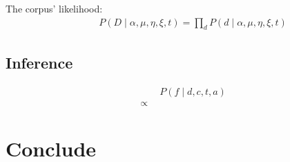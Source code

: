 \documentclass{article}
\begin{document}
\noindent The corpus' likelihood:
\begin{align}
& \qquad P(D \mid \alpha, \mu, \eta, \xi, t) = \prod_d P(d \mid \alpha, \mu, \eta, \xi, t)
\end{align}

\subsection{Inference}
\begin{align}
& \qquad P(f \mid d, c, t, a) \\
&\propto 
\end{align}


\section{Conclude}
\end{document}
